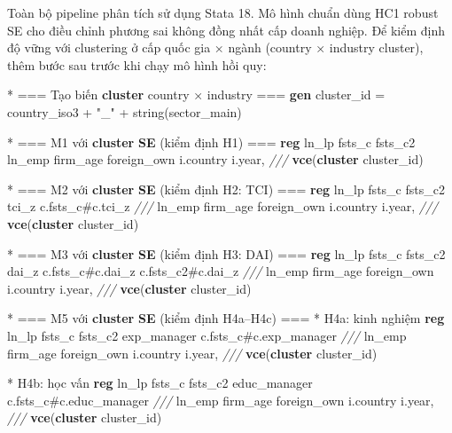 \documentclass[
  a4paper,
  13pt]{extreport}
\newenvironment{Shaded}{}{}
\newcommand{\CommentTok}[1]{\textcolor[rgb]{0.38,0.63,0.69}{\textit{#1}}}
\newcommand{\FunctionTok}[1]{\textcolor[rgb]{0.02,0.16,0.49}{#1}}
\newcommand{\KeywordTok}[1]{\textcolor[rgb]{0.00,0.44,0.13}{\textbf{#1}}}
\newcommand{\NormalTok}[1]{#1}
\newcommand{\StringTok}[1]{\textcolor[rgb]{0.25,0.44,0.63}{#1}}
\begin{document}
Toàn bộ pipeline phân tích sử dụng Stata 18. Mô hình chuẩn dùng HC1
robust SE cho điều chỉnh phương sai không đồng nhất cấp doanh nghiệp. Để
kiểm định độ vững với clustering ở cấp quốc gia × ngành (country ×
industry cluster), thêm bước sau trước khi chạy mô hình hồi quy:

\begin{Shaded}
\begin{Highlighting}[]
\NormalTok{* === Tạo biến }\KeywordTok{cluster}\NormalTok{ country × industry ===}
\KeywordTok{gen}\NormalTok{ cluster\_id = country\_iso3 + }\StringTok{"\_"}\NormalTok{ + }\FunctionTok{string}\NormalTok{(sector\_main)}

\NormalTok{* === M1 với }\KeywordTok{cluster} \KeywordTok{SE}\NormalTok{ (kiểm định H1) ===}
\KeywordTok{reg}\NormalTok{ ln\_lp fsts\_c fsts\_c2 ln\_emp firm\_age foreign\_own i.country i.}\FunctionTok{year}\NormalTok{, }\CommentTok{///}
    \KeywordTok{vce}\NormalTok{(}\KeywordTok{cluster}\NormalTok{ cluster\_id)}

\NormalTok{* === M2 với }\KeywordTok{cluster} \KeywordTok{SE}\NormalTok{ (kiểm định H2: TCI) ===}
\KeywordTok{reg}\NormalTok{ ln\_lp fsts\_c fsts\_c2 tci\_z c.fsts\_c\#c.tci\_z }\CommentTok{///}
\NormalTok{    ln\_emp firm\_age foreign\_own i.country i.}\FunctionTok{year}\NormalTok{, }\CommentTok{///}
    \KeywordTok{vce}\NormalTok{(}\KeywordTok{cluster}\NormalTok{ cluster\_id)}

\NormalTok{* === M3 với }\KeywordTok{cluster} \KeywordTok{SE}\NormalTok{ (kiểm định H3: DAI) ===}
\KeywordTok{reg}\NormalTok{ ln\_lp fsts\_c fsts\_c2 dai\_z c.fsts\_c\#c.dai\_z c.fsts\_c2\#c.dai\_z }\CommentTok{///}
\NormalTok{    ln\_emp firm\_age foreign\_own i.country i.}\FunctionTok{year}\NormalTok{, }\CommentTok{///}
    \KeywordTok{vce}\NormalTok{(}\KeywordTok{cluster}\NormalTok{ cluster\_id)}

\NormalTok{* === M5 với }\KeywordTok{cluster} \KeywordTok{SE}\NormalTok{ (kiểm định H4a–H4c) ===}
\NormalTok{* H4a: kinh nghiệm}
\KeywordTok{reg}\NormalTok{ ln\_lp fsts\_c fsts\_c2 exp\_manager c.fsts\_c\#c.exp\_manager }\CommentTok{///}
\NormalTok{    ln\_emp firm\_age foreign\_own i.country i.}\FunctionTok{year}\NormalTok{, }\CommentTok{///}
    \KeywordTok{vce}\NormalTok{(}\KeywordTok{cluster}\NormalTok{ cluster\_id)}

\NormalTok{* H4b: học vấn}
\KeywordTok{reg}\NormalTok{ ln\_lp fsts\_c fsts\_c2 educ\_manager c.fsts\_c\#c.educ\_manager }\CommentTok{///}
\NormalTok{    ln\_emp firm\_age foreign\_own i.country i.}\FunctionTok{year}\NormalTok{, }\CommentTok{///}
    \KeywordTok{vce}\NormalTok{(}\KeywordTok{cluster}\NormalTok{ cluster\_id)}


\end{Highlighting}
\end{Shaded}
\end{document}
